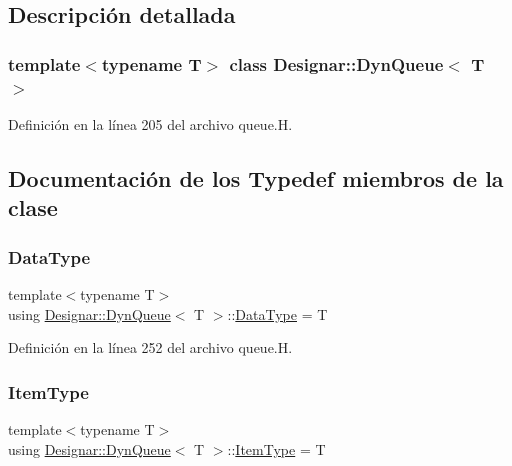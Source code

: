 \subsection{Descripción detallada}
\subsubsection*{template$<$typename T$>$\newline
class Designar\+::\+Dyn\+Queue$<$ T $>$}



Definición en la línea 205 del archivo queue.\+H.



\subsection{Documentación de los \textquotesingle{}Typedef\textquotesingle{} miembros de la clase}
\mbox{\label{class_designar_1_1_dyn_queue_a79504f1ab8156a3eaee8c9c0aaaf1b8a}} 
\subsubsection{\texorpdfstring{Data\+Type}{DataType}}
{\footnotesize\ttfamily template$<$typename T$>$ \\
using \hyperlink{class_designar_1_1_dyn_queue}{Designar\+::\+Dyn\+Queue}$<$ T $>$\+::\hyperlink{class_designar_1_1_fixed_array_a3e37931b909b840cb7a40fc73f12bcf5}{Data\+Type} =  T}



Definición en la línea 252 del archivo queue.\+H.

\mbox{\label{class_designar_1_1_dyn_queue_a45a4b5b9dd6a921dbc6919802d34dd9e}} 
\subsubsection{\texorpdfstring{Item\+Type}{ItemType}}
{\footnotesize\ttfamily template$<$typename T$>$ \\
using \hyperlink{class_designar_1_1_dyn_queue}{Designar\+::\+Dyn\+Queue}$<$ T $>$\+::\hyperlink{class_designar_1_1_fixed_array_abfeb4e683cee75ae782ad20294c4c808}{Item\+Type} =  T}



